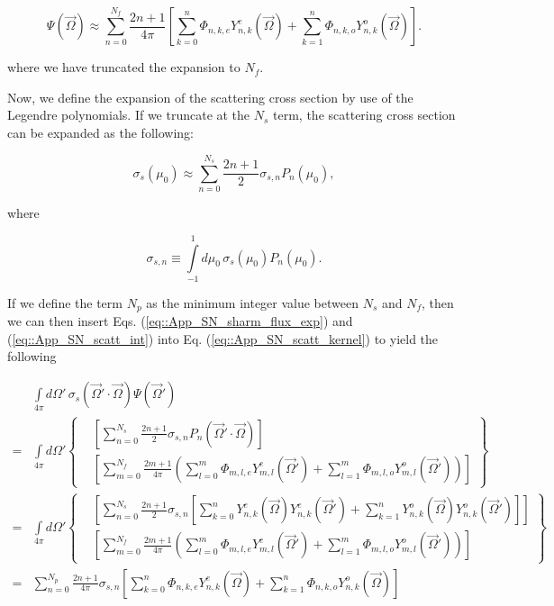 \begin{equation}
\label{eq::App_SN_sharm_flux_exp}
\Psi(\vec{\Omega}) \approx \sum^{N_f}_{n=0} \frac{2n+1}{4 \pi} \left[ \sum_{k=0}^{n} \Phi_{n,k,e} Y^e_{n,k} (\vec{\Omega}) + \sum_{k=1}^{n} \Phi_{n,k,o} Y^o_{n,k} (\vec{\Omega})  \right] .
\end{equation}

\noindent where we have truncated the expansion to $N_f$. 

Now, we define the expansion of the scattering cross section by use of the Legendre polynomials. If we truncate at the $N_s$ term, the scattering cross section can be expanded as the following:

\begin{equation}
\label{eq::App_SN_scatt_exp}
\sigma_s (\mu_0) \approx \sum_{n=0}^{N_s} \frac{2n+1}{2} \sigma_{s,n} P_n (\mu_0) ,
\end{equation}

\noindent where 

\begin{equation}
\label{eq::App_SN_scatt_int}
\sigma_{s,n} \equiv \int\limits_{-1}^{1} d \mu_0 \, \sigma_s (\mu_0) P_n (\mu_0).
\end{equation}

If we define the term $N_p$ as the minimum integer value between $N_s$ and $N_f$, then we can then insert Eqs. (\ref{eq::App_SN_sharm_flux_exp}) and (\ref{eq::App_SN_scatt_int}) into Eq. (\ref{eq::App_SN_scatt_kernel}) to yield the following

\begin{equation}
\label{eq::App_SN_scatt_kernel_inserted}
\begin{aligned}
&\int\limits_{4 \pi} d \Omega' \, \sigma_s (\vec{\Omega}' \cdot \vec{\Omega}) \Psi (\vec{\Omega}')\\
= &\int\limits_{4 \pi} d \Omega'
\left\{ \begin{aligned}
&\left[\sum_{n=0}^{N_s} \frac{2n+1}{2} \sigma_{s,n} P_n (\vec{\Omega}' \cdot \vec{\Omega}) \right] \\
  &\left[\sum^{N_f}_{m=0} \frac{2m+1}{4 \pi} \left( \sum_{l=0}^{m} \Phi_{m,l,e} Y^e_{m,l} (\vec{\Omega}') + \sum_{l=1}^{m} \Phi_{m,l,o} Y^o_{m,l} (\vec{\Omega}')  \right) \right]
\end{aligned} \right\} \\
= &\int\limits_{4 \pi} d \Omega'
\left\{ \begin{aligned}
&\left[\sum_{n=0}^{N_s} \frac{2n+1}{2} \sigma_{s,n}\left[ \sum_{k=0}^{n} Y^e_{n,k} (\vec{\Omega}) Y^e_{n,k} (\vec{\Omega}') + \sum_{k=1}^{n} Y^o_{n,k} (\vec{\Omega}) Y^o_{n,k} (\vec{\Omega}') \right] \right]\\
  &\left[\sum^{N_f}_{m=0} \frac{2m+1}{4 \pi} \left( \sum_{l=0}^{m} \Phi_{m,l,e} Y^e_{m,l} (\vec{\Omega}') + \sum_{l=1}^{m} \Phi_{m,l,o} Y^o_{m,l} (\vec{\Omega}')  \right) \right]
\end{aligned} \right\} \\
=&\sum_{n=0}^{N_p} \frac{2n+1}{4 \pi}\sigma_{s,n} \left[  \sum_{k=0}^{n} \Phi_{n,k,e} Y^e_{n,k} (\vec{\Omega}) + \sum_{k=1}^{n} \Phi_{n,k,o} Y^o_{n,k} (\vec{\Omega})  \right]
\end{aligned}
\end{equation}

